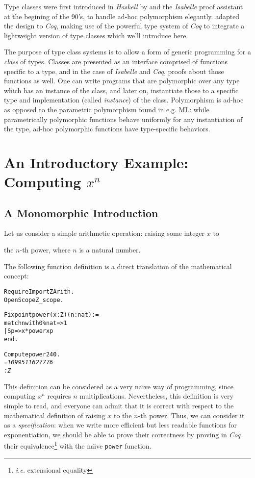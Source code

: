 \documentclass[a4]{report}
\newcommand{\coq}{\mbox{\emph{Coq}}}
\newcommand{\isabelle}{\mbox{\emph{Isabelle}}}
\newcommand{\haskell}{\mbox{\emph{Haskell}}}
\begin{document}
Type classes were first introduced in {\haskell} by \citet{WadlerBlott89} and the {\isabelle} proof
assistant \citep{DBLP:conf/fpca/NipkowS91} at the begining of the
90's, to handle ad-hoc polymorphism
elegantly. \cite{DBLP:conf/tphol/SozeauO08} adapted the design to
{\coq}, making use of the powerful type system of {\coq} to integrate a
lightweight version of type classes which we'll introduce here.

The purpose of type class systems is to allow a form of generic
programming for a \emph{class} of types. Classes are presented as an
interface comprised of functions specific to a type, and in the case of
{\isabelle} and {\coq}, proofs about those functions as well. One can
write programs that are polymorphic over any type which has an instance
of the class, and later on, instantiate those to a specific type and
implementation (called \emph{instance}) of the class. Polymorphism is
ad-hoc as opposed to the parametric polymorphism found in e.g. ML:
while parametrically polymorphic functions behave uniformly for any
instantiation of the type, ad-hoc polymorphic functions have
type-specific behaviors. 

\chapter{An Introductory Example: Computing $x^n$}
\section{A Monomorphic Introduction}
Let us consider a simple arithmetic operation: raising some integer $x$ to

the $n$-th power, where $n$ is a natural number.

The following function definition is a direct translation of the mathematical
concept:
\begin{alltt}
Require Import ZArith.
Open Scope Z_scope.

Fixpoint power (x:Z)(n:nat) :=
  match n with 0\%nat => 1
             | S p =>  x * power x p
  end.

Compute power 2 40.\it\color{answercolor}
    =  1099511627776
     : Z
\end{alltt}

This definition can be considered as a very na\"{\i}ve way of programming,
since computing $x^n$ requires $n$ multiplications. 
 Nevertheless, this definition is 
very simple to read, and everyone can admit that it is  correct 
with respect to the mathematical definition of raising $x$ to the $n$-th power.
Thus, we can consider it as a \emph{specification}: when we write 
more efficient but less readable functions for exponentiation,
 we should be able
to prove their correctness by proving in \coq{} their equivalence\footnote{\emph{i.e.} extensional equality} 
with the na\"{\i}ve \texttt{power} function.
\end{document}
